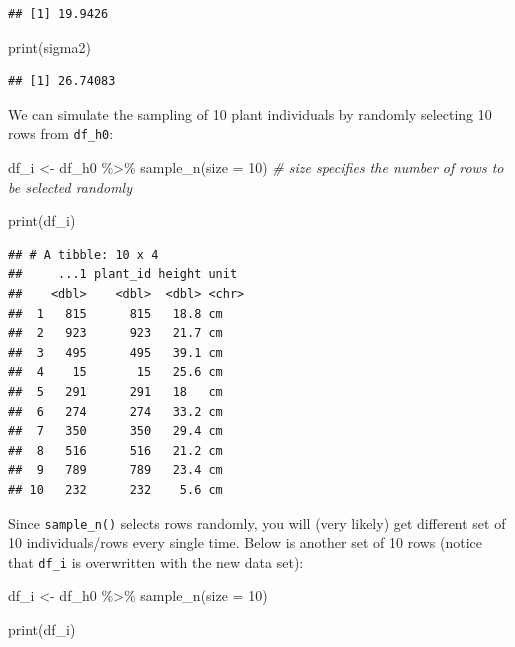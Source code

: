 \documentclass[
]{book}
\newenvironment{Shaded}{\begin{snugshade}}{\end{snugshade}}
\newcommand{\AttributeTok}[1]{\textcolor[rgb]{0.77,0.63,0.00}{#1}}
\newcommand{\CommentTok}[1]{\textcolor[rgb]{0.56,0.35,0.01}{\textit{#1}}}
\newcommand{\DecValTok}[1]{\textcolor[rgb]{0.00,0.00,0.81}{#1}}
\newcommand{\FunctionTok}[1]{\textcolor[rgb]{0.00,0.00,0.00}{#1}}
\newcommand{\NormalTok}[1]{#1}
\newcommand{\OtherTok}[1]{\textcolor[rgb]{0.56,0.35,0.01}{#1}}
\newcommand{\SpecialCharTok}[1]{\textcolor[rgb]{0.00,0.00,0.00}{#1}}
\begin{document}
\begin{verbatim}
## [1] 19.9426
\end{verbatim}

\begin{Shaded}
\begin{Highlighting}[]
\FunctionTok{print}\NormalTok{(sigma2)}
\end{Highlighting}
\end{Shaded}

\begin{verbatim}
## [1] 26.74083
\end{verbatim}

We can simulate the sampling of 10 plant individuals by randomly selecting 10 rows from \texttt{df\_h0}:

\begin{Shaded}
\begin{Highlighting}[]
\NormalTok{df\_i }\OtherTok{\textless{}{-}}\NormalTok{ df\_h0 }\SpecialCharTok{\%\textgreater{}\%} 
  \FunctionTok{sample\_n}\NormalTok{(}\AttributeTok{size =} \DecValTok{10}\NormalTok{) }\CommentTok{\# size specifies the number of rows to be selected randomly}

\FunctionTok{print}\NormalTok{(df\_i)}
\end{Highlighting}
\end{Shaded}

\begin{verbatim}
## # A tibble: 10 x 4
##     ...1 plant_id height unit 
##    <dbl>    <dbl>  <dbl> <chr>
##  1   815      815   18.8 cm   
##  2   923      923   21.7 cm   
##  3   495      495   39.1 cm   
##  4    15       15   25.6 cm   
##  5   291      291   18   cm   
##  6   274      274   33.2 cm   
##  7   350      350   29.4 cm   
##  8   516      516   21.2 cm   
##  9   789      789   23.4 cm   
## 10   232      232    5.6 cm
\end{verbatim}

Since \texttt{sample\_n()} selects rows randomly, you will (very likely) get different set of 10 individuals/rows every single time. Below is another set of 10 rows (notice that \texttt{df\_i} is overwritten with the new data set):

\begin{Shaded}
\begin{Highlighting}[]
\NormalTok{df\_i }\OtherTok{\textless{}{-}}\NormalTok{ df\_h0 }\SpecialCharTok{\%\textgreater{}\%} 
  \FunctionTok{sample\_n}\NormalTok{(}\AttributeTok{size =} \DecValTok{10}\NormalTok{)}

\FunctionTok{print}\NormalTok{(df\_i)}
\end{Highlighting}
\end{Shaded}
\end{document}
